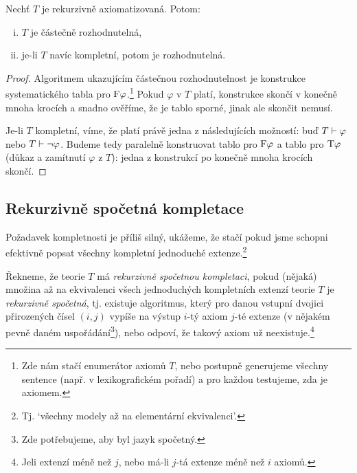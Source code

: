\begin{proposition}
    Nechť $T$ je rekurzivně axiomatizovaná. Potom:
    \begin{enumerate}[(i)]
        \item $T$ je částečně rozhodnutelná,
        \item je-li $T$ navíc kompletní, potom je rozhodnutelná.
    \end{enumerate}
\end{proposition}
\begin{proof}
Algoritmem ukazujícím částečnou rozhodnutelnost je konstrukce systematického tabla pro $\mathrm{F}\varphi$.\footnote{Zde nám stačí enumerátor axiomů $T$, nebo postupně generujeme všechny sentence (např. v lexikografickém pořadí) a pro každou testujeme, zda je axiomem.} Pokud $\varphi$ v $T$ platí, konstrukce skončí v konečně mnoha krocích a snadno ověříme, že je tablo sporné, jinak ale skončit nemusí.

Je-li $T$ kompletní, víme, že platí právě jedna z následujících možností: buď $T\vdash\varphi$ nebo $T\vdash\neg\varphi$. Budeme tedy paralelně konstruovat tablo pro $\mathrm{F}\varphi$ a tablo pro $\mathrm{T}\varphi$ (důkaz a zamítnutí $\varphi$ z $T$): jedna z konstrukcí po konečně mnoha krocích skončí.
\end{proof}


\subsection{Rekurzivně spočetná kompletace}

Požadavek kompletnosti je příliš silný, ukážeme, že stačí pokud jsme schopni efektivně popsat všechny kompletní jednoduché extenze.\footnote{Tj. `všechny modely až na elementární ekvivalenci'.}

\begin{definition}
Řekneme, že teorie $T$ má \emph{rekurzivně spočetnou kompletaci}, pokud (nějaká) množina až na ekvivalenci všech jednoduchých kompletních extenzí teorie $T$ je \emph{rekurzivně spočetná}, tj. existuje algoritmus, který pro danou vstupní dvojici přirozených čísel $(i,j)$ vypíše na výstup $i$-tý axiom $j$-té extenze (v nějakém pevně daném uspořádání\footnote{Zde potřebujeme, aby byl jazyk spočetný.}), nebo odpoví, že takový axiom už neexistuje.\footnote{Jeli extenzí méně než $j$, nebo má-li $j$-tá extenze méně než $i$ axiomů.}
\end{definition}

